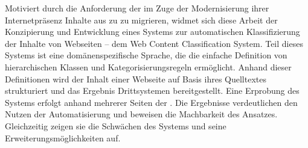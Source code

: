 Motiviert durch die Anforderung der {\fernUni} im Zuge der Modernisierung ihrer
Internetpräsenz Inhalte aus {\wordpress} zu {\imperia} zu migrieren,
widmet sich diese Arbeit der Konzipierung und Entwicklung eines Systems
zur automatischen Klassifizierung der Inhalte von Webseiten
-- dem Web Content Classification System.
Teil dieses Systems ist eine domänenspezifische Sprache, die die einfache
Definition von hierarchischen Klassen und Kategorisierungsregeln ermöglicht.
Anhand dieser Definitionen wird der Inhalt einer Webseite auf Basis ihres
Quelltextes strukturiert und das Ergebnis Drittsystemen bereitgestellt.
Eine Erprobung des Systems erfolgt anhand mehrerer Seiten der {\fernUni}.
Die Ergebnisse verdeutlichen den Nutzen der Automatisierung und
beweisen die Machbarkeit des Ansatzes.
Gleichzeitig zeigen sie die Schwächen des Systems und seine Erweiterungsmöglichkeiten auf.